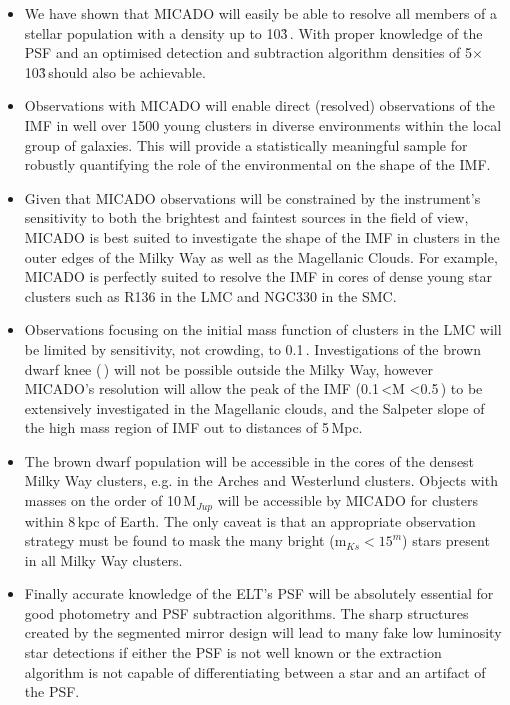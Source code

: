 \begin{itemize}
    \item We have shown that MICADO will easily be able to resolve all members of a stellar population with a density up to 10\h3\,\spa. With proper knowledge of the PSF and an optimised detection and subtraction algorithm densities of 5$\times$10\h3\,\spa should also be achievable.
    
    \item Observations with MICADO will enable direct (resolved) observations of the IMF in well over 1500 young clusters in diverse environments within the local group of galaxies. This will provide a statistically meaningful sample for robustly quantifying the role of the environmental on the shape of the IMF.

    \item Given that MICADO observations will be constrained by the instrument's sensitivity to both the brightest and faintest sources in the field of view, MICADO is best suited to investigate the shape of the IMF in clusters in the outer edges of the Milky Way as well as the Magellanic Clouds. For example, MICADO is perfectly suited to resolve the IMF in cores of dense young star clusters such as R136 in the LMC and NGC330 in the SMC.
    
    \item Observations focusing on the initial mass function of clusters in the LMC will be limited by sensitivity, not crowding, to 0.1\,\msun. Investigations of the brown dwarf knee (\,\msun) will not be possible outside the Milky Way, however MICADO's resolution will allow the peak of the IMF (0.1\,\msun\textless M \textless0.5\,\msune) to be extensively investigated in the Magellanic clouds, and the Salpeter slope of the high mass region of IMF out to distances of 5\,Mpc.
    
    \item The brown dwarf population will be accessible in the cores of the densest Milky Way clusters, e.g. in the Arches and Westerlund clusters. Objects with masses on the order of 10\,M$_{Jup}$ will be accessible by MICADO for clusters within 8\,kpc of Earth. The only caveat is that an appropriate observation strategy must be found to mask the many bright (m$_{Ks}<15^m$) stars present in all Milky Way clusters.
    
    \item Finally accurate knowledge of the ELT's PSF will be absolutely essential for good photometry and PSF subtraction algorithms. The sharp structures created by the segmented mirror design will lead to many fake low luminosity star detections if either the PSF is not well known or the extraction algorithm is not capable of differentiating between a star and an artifact of the PSF.
    
\end{itemize}


